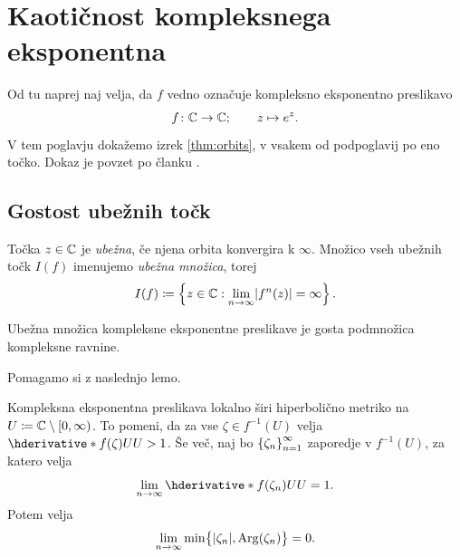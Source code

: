 \section{Kaotičnost kompleksnega eksponentna} \label{sec:dokaz}

Od tu naprej naj velja, da \(f\) vedno označuje kompleksno eksponentno preslikavo
\[f \colon \mathbb C \to \mathbb C; \qquad z \mapsto e^{z}.\]
V tem poglavju dokažemo izrek \ref{thm:orbits}, v vsakem od podpoglavij po eno točko. Dokaz je povzet po članku \cite{Shen_2015}.

\subsection{Gostost ubežnih točk}

Točka \(z \in \mathbb C\) je \emph{ubežna}, če njena orbita konvergira k \(\infty\). Množico vseh ubežnih točk \(I (f)\) imenujemo \emph{ubežna množica}, torej
\[I (f) \coloneq \set{z \in \CC : \lim_{n \to \infty} \abs{f^n (z)} = \infty}.\]

\begin{izrek} \label{thm:escapingdense}
    Ubežna množica kompleksne eksponentne preslikave je gosta podmnožica kompleksne ravnine.
\end{izrek}

\noindent Pomagamo si z naslednjo lemo.

\begin{lema} \label{lem:hyper}
    Kompleksna eksponentna preslikava lokalno širi hiperbolično metriko na \(U \coloneq \mathbb C \setminus [0, \infty)\). To pomeni, da za vse \(\zeta \in f^{-1} (U)\) velja \(\hder{f (\zeta)}{U}{U} > 1\). Še več, naj bo \(\left\{ \zeta_n \right\}_{n = 1}^{\infty}\) zaporedje v \(f^{-1} (U)\), za katero velja \[\lim_{n \to \infty} \hder{f (\zeta_n)}{U}{U} = 1.\] Potem velja
    \[\lim_{n \to \infty} \min \bigl\{ |\zeta_n|, \operatorname{Arg} (\zeta_n) \bigr\} = 0.\]
\end{lema}

